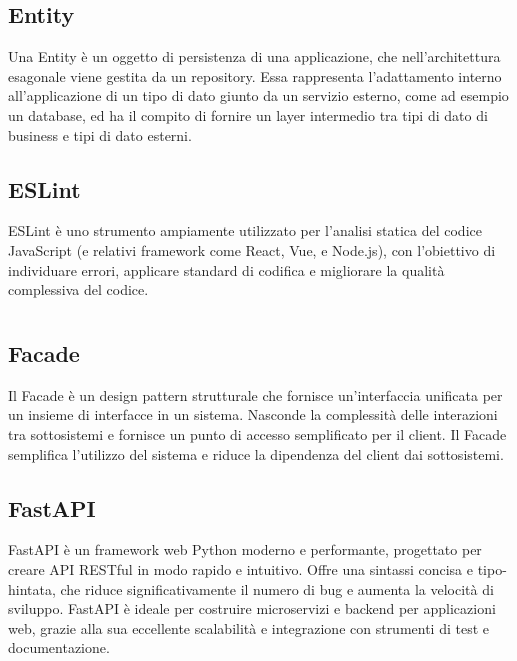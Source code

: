 \hypertarget{sec:entity}{}
\subsection*{Entity}
Una Entity è un oggetto di persistenza di una applicazione, che nell'architettura esagonale viene gestita da un repository.
Essa rappresenta l'adattamento interno all'applicazione di un tipo di dato giunto da un servizio esterno, come ad esempio un database,
ed ha il compito di fornire un layer intermedio tra tipi di dato di business e tipi di dato esterni.

\hypertarget{sec:eslint}{}
\subsection*{ESLint}
ESLint è uno strumento ampiamente utilizzato per l'analisi statica del codice JavaScript (e relativi framework come React, Vue, e Node.js), 
con l'obiettivo di individuare errori, applicare standard di codifica e migliorare la qualità complessiva del codice.
\newpage



\section{}

\hypertarget{sec:facade}{}
\subsection*{Facade}
Il Facade è un design pattern strutturale che fornisce un'interfaccia unificata per un insieme di interfacce in un sistema. Nasconde la complessità
delle interazioni tra sottosistemi e fornisce un punto di accesso semplificato per il client. Il Facade semplifica l'utilizzo del sistema e riduce la
dipendenza del client dai sottosistemi.

\hypertarget{sec:fastapi}{}
\subsection*{FastAPI}
FastAPI è un framework web Python moderno e performante, progettato per creare API RESTful in modo rapido e intuitivo. Offre una sintassi 
concisa e tipo-hintata, che riduce significativamente il numero di bug e aumenta la velocità di sviluppo. FastAPI è ideale per 
costruire microservizi e backend per applicazioni web, grazie alla sua eccellente scalabilità e integrazione con strumenti di 
test e documentazione.

